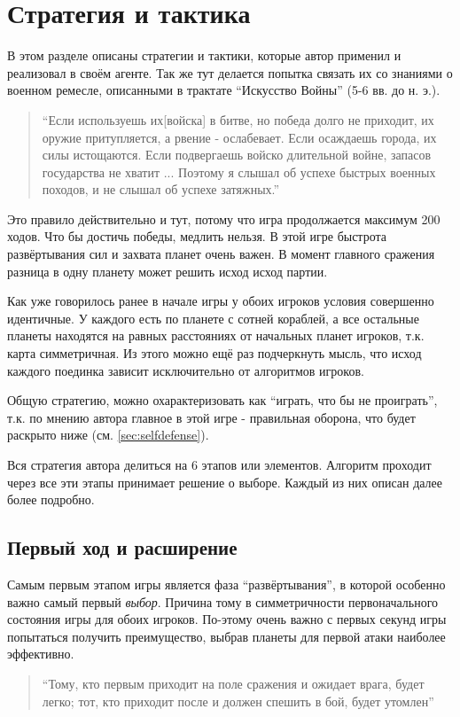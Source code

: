 \documentclass[12pt]{report}
\begin{document}
\section{Стратегия и тактика}
\label{sec:strategic}
В этом разделе описаны стратегии и тактики, которые автор применил и реализовал в своём агенте. Так же тут делается попытка связать их со знаниями о военном ремесле, описанными в трактате ``Искусство Войны'' (5-6 вв. до н. э.).

\begin{quote}
``Если используешь их[войска] в битве, но победа долго не приходит, их оружие притупляется, а рвение - ослабевает. Если осаждаешь города, их силы истощаются. Если подвергаешь войско длительной войне, запасов государства не хватит ... Поэтому я слышал об успехе быстрых военных походов, и не слышал об успехе затяжных.'' \citep{tzu1971art}
\end{quote}
Это правило действительно и тут, потому что игра продолжается максимум 200 ходов. Что бы достичь победы, медлить нельзя. В этой игре быстрота развёртывания сил и захвата планет очень важен. В момент главного сражения разница в одну планету может решить исход исход партии.

Как уже говорилось ранее в начале игры у обоих игроков условия совершенно идентичные. У каждого есть по планете с сотней кораблей, а все остальные планеты находятся на равных расстояниях от начальных планет игроков, т.к. карта симметричная. Из этого можно ещё раз подчеркнуть мысль, что исход каждого поединка зависит исключительно от алгоритмов игроков.

Общую стратегию, можно охарактеризовать как ``играть, что бы не проиграть'', т.к. по мнению автора главное в этой игре - правильная оборона, что будет раскрыто ниже (см. \ref{sec:selfdefense}).

Вся стратегия автора делиться на 6 этапов или элементов. Алгоритм проходит через все эти этапы принимает решение о выборе. Каждый из них описан далее более подробно.

\subsection{Первый ход и расширение}
Самым первым этапом игры является фаза ``развёртывания'', в которой особенно важно самый первый \emph{выбор}. Причина тому в симметричности первоначального состояния игры для обоих игроков. По-этому очень важно с первых секунд игры попытаться получить преимущество, выбрав планеты для первой атаки наиболее эффективно. 
\begin{quote}
``Тому, кто первым приходит на поле сражения и ожидает врага, будет
легко; тот, кто приходит после и должен спешить в бой, будет утомлен''  \\
\hfill \citep{tzu1971art}
\end{quote}
\end{document}
